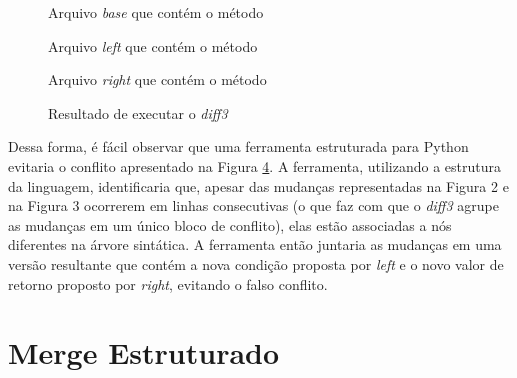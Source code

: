 \begin{figure}[ht]
\begin{center}
    
    \caption{Arquivo \emph{base} que contém o método }\label{base_example}
\end{center}
\end{figure}
\begin{figure}[ht]
\begin{center}
    
    \caption{Arquivo \emph{left} que contém o método }\label{left_example}
\end{center}
\end{figure}
\begin{figure}[ht]
\begin{center}
    
    \caption{Arquivo \emph{right} que contém o método }\label{right_example}
\end{center}
\end{figure}
\begin{figure}[ht]
\begin{center}
    
\end{center}
\caption{Resultado de executar o \emph{diff3}}\label{diff3_example}
\end{figure}

Dessa forma, é fácil observar que uma ferramenta estruturada para Python evitaria o
conflito apresentado na Figura \ref{diff3_example}. A ferramenta, utilizando a estrutura da
linguagem, identificaria que, apesar das mudanças representadas na Figura 2 e na
Figura 3 ocorrerem em linhas consecutivas (o que faz com que o \emph{diff3} agrupe as mudanças em um único bloco de conflito),
elas estão associadas a nós diferentes na árvore
sintática. A ferramenta então juntaria as mudanças em uma versão resultante que contém a
nova condição proposta por \emph{left} e o novo valor de retorno proposto por \emph{right},
evitando o falso conflito.

\section{Merge Estruturado}
